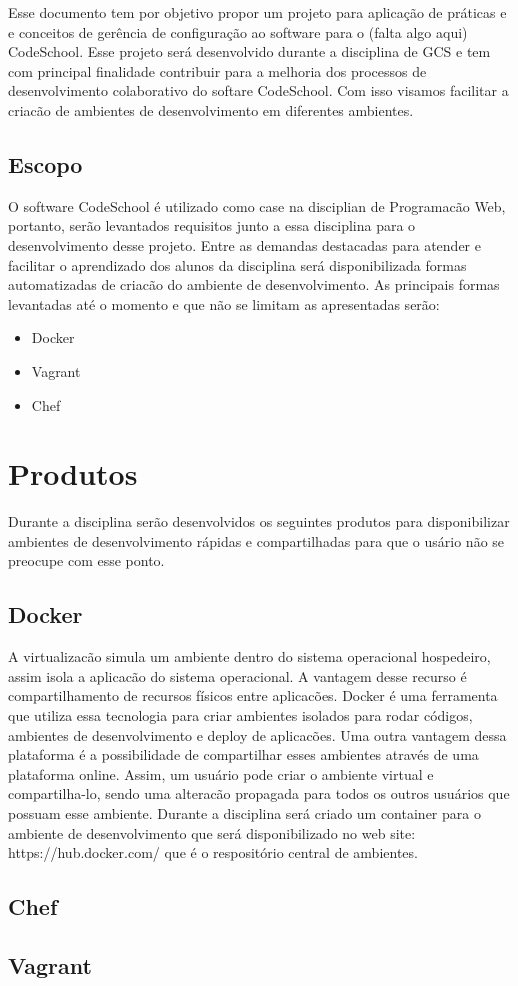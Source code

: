 \documentclass{article}
\begin{document}
Esse documento tem por objetivo propor um projeto para aplicação de práticas e e conceitos de gerência de configuração ao software para o (falta algo aqui) CodeSchool. Esse projeto será desenvolvido durante a disciplina de GCS e tem com principal finalidade contribuir para a melhoria dos processos de desenvolvimento colaborativo do softare CodeSchool. Com isso visamos facilitar a criacão de ambientes de desenvolvimento em diferentes ambientes. 

\subsection{Escopo}

O software CodeSchool é utilizado como case na disciplian de Programacão Web, portanto, serão levantados requisitos junto a essa disciplina para o desenvolvimento desse projeto. Entre as demandas destacadas para atender e facilitar o aprendizado dos alunos da disciplina será disponibilizada formas automatizadas de criacão do ambiente de desenvolvimento. As principais formas levantadas até o momento e que não se limitam as apresentadas serão:

\begin{itemize}
    \item Docker
    \item Vagrant 
    \item Chef
\end{itemize}
  
\newpage

\section{Produtos}

Durante a disciplina serão desenvolvidos os seguintes produtos para disponibilizar ambientes de desenvolvimento rápidas e compartilhadas para que o usário não se preocupe com esse ponto.

\subsection{Docker}

A virtualizacão simula um ambiente dentro do sistema operacional hospedeiro, assim isola a aplicacão do sistema operacional. A vantagem desse recurso é compartilhamento de recursos físicos entre aplicacões. Docker é uma ferramenta que utiliza essa tecnologia para criar ambientes isolados para rodar códigos, ambientes de desenvolvimento e deploy de aplicacões. Uma outra vantagem dessa plataforma é a possibilidade de compartilhar esses ambientes através de uma plataforma online. Assim, um usuário pode criar o ambiente virtual e compartilha-lo, sendo uma alteracão propagada para todos os outros usuários que possuam esse ambiente. Durante a disciplina será criado um container para o ambiente de desenvolvimento que será disponibilizado no web site: https://hub.docker.com/ que é o respositório central de ambientes. 

\subsection{Chef}

\subsection{Vagrant}
\end{document}
